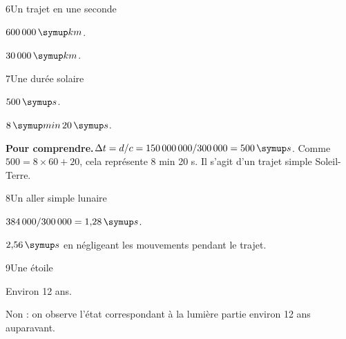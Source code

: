 \par\noindent\begin{minipage}{\linewidth}
\begin{corrige}{6}{Un trajet en une seconde}
\begin{questions}
\item $600\,000\unite{km}$.
\item $30\,000\unite{km}$.
\end{questions}
\end{corrige}
\end{minipage}
\par\noindent\begin{minipage}{\linewidth}
\begin{corrige}{7}{Une durée solaire}
\begin{questions}
\item $500\unite s$.
\item $8\unite{min}\,20\unite s$.
\end{questions}
\par\smallskip\noindent\textbf{Pour comprendre.}\enspace $\Delta t=d/c=150\,000\,000/300\,000=500\unite s$. Comme $500=8\times60+20$, cela représente 8 min 20 s. Il s’agit d’un trajet simple Soleil-Terre.\par
\end{corrige}
\end{minipage}
\par\noindent\begin{minipage}{\linewidth}
\begin{corrige}{8}{Un aller simple lunaire}
\begin{questions}
\item $384\,000/300\,000=1{,}28\unite s$.
\item $2{,}56\unite s$ en négligeant les mouvements pendant le trajet.
\end{questions}
\end{corrige}
\end{minipage}
\par\noindent\begin{minipage}{\linewidth}
\begin{corrige}{9}{Une étoile}
\begin{questions}
\item Environ 12 ans.
\item Non : on observe l’état correspondant à la lumière partie environ 12 ans auparavant.
\end{questions}
\end{corrige}
\end{minipage}
